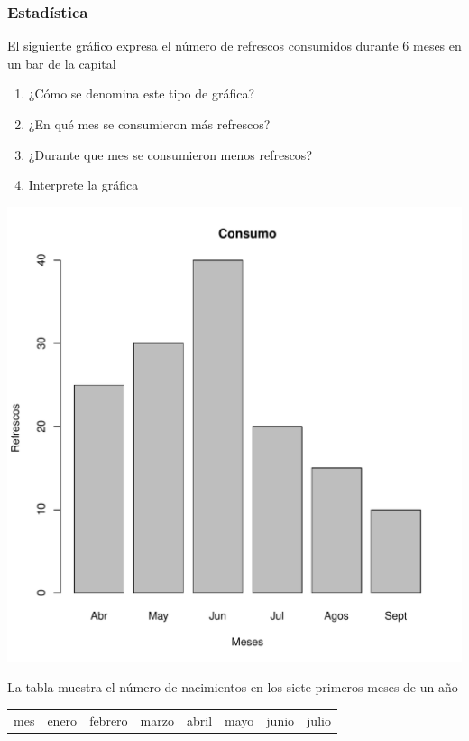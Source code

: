 \documentclass[letterpaper,11pt,twoside]{article}
\begin{document}
\begin{enumerate}
\subsubsection*{Estad\'{i}stica}
\begin{minipage}{.45\textwidth}
\item El siguiente gr\'{a}fico expresa el n\'{u}mero de refrescos consumidos durante 6 meses en un bar de la capital
\begin{enumerate}
\item ¿Cómo se denomina este tipo de gráfica?
\item ¿En qué mes se consumieron más refrescos?
\item ¿Durante que mes se consumieron menos refrescos?
\item Interprete la gráfica
\end{enumerate}
\end{minipage} \hfill
\begin{minipage}{.55\textwidth}
\includegraphics[scale=.4]{Images/refrescosgraf.pdf}   
\end{minipage}
\item La tabla muestra el número de nacimientos en los siete primeros meses de un año
\begin{center}
\begin{tabular}{|c|c|c|c|c|c|c|c|}
\hline 
mes & enero & febrero & marzo & abril & mayo & junio & julio \\ 

\end{tabular}
\end{center}
\end{enumerate}
\end{document}
